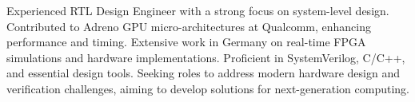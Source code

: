 \begin{cvSummary}
Experienced RTL Design Engineer with a strong focus on system-level design. Contributed to Adreno GPU micro-architectures at Qualcomm, enhancing performance and timing. Extensive work in Germany on real-time FPGA simulations and hardware implementations. Proficient in SystemVerilog, C/C++, and essential design tools. Seeking roles to address modern hardware design and verification challenges, aiming to develop solutions for next-generation computing.
\end{cvSummary}    